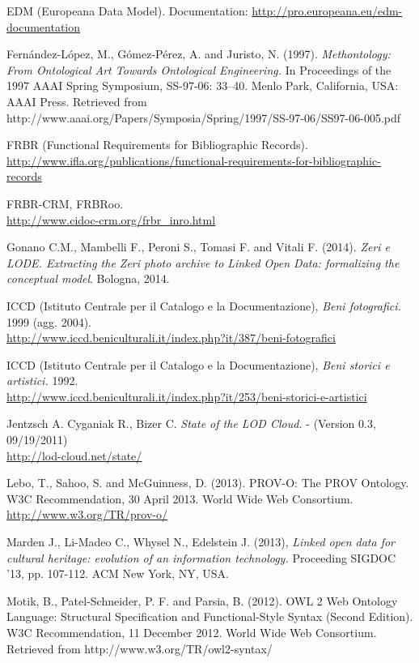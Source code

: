 \begin{thebibliography}{90}
 EDM (Europeana Data Model). Documentation: \url{http://pro.europeana.eu/edm-documentation}

 Fernández-López, M., Gómez-Pérez, A. and Juristo, N. (1997). \emph{Methontology: From Ontological Art Towards Ontological Engineering.} In Proceedings of the 1997 AAAI Spring Symposium, SS-97-06: 33–40. Menlo Park, California, USA: AAAI Press. Retrieved from http://www.aaai.org/Papers/Symposia/Spring/1997/SS-97-06/SS97-06-005.pdf

 FRBR (Functional Requirements for Bibliographic Records).\\
\url{http://www.ifla.org/publications/functional-requirements-for-bibliographic-records}

 FRBR-CRM, FRBRoo.\\
\url{http://www.cidoc-crm.org/frbr_inro.html}

 Gonano C.M., Mambelli F., Peroni S., Tomasi F. and Vitali F. (2014). \emph{Zeri e LODE. Extracting the Zeri photo archive to Linked Open Data: formalizing the conceptual model}. Bologna, 2014.

 ICCD (Istituto Centrale per il Catalogo e la Documentazione), \emph{Beni fotografici.} 1999 (agg. 2004).\\
\url{http://www.iccd.beniculturali.it/index.php?it/387/beni-fotografici}

 ICCD (Istituto Centrale per il Catalogo e la Documentazione), \emph{Beni storici e artistici.} 1992.\\
\url{http://www.iccd.beniculturali.it/index.php?it/253/beni-storici-e-artistici}

 Jentzsch A. Cyganiak R., Bizer C. \emph{State of the LOD Cloud.} - (Version 0.3, 09/19/2011)\\
\url{http://lod-cloud.net/state/}

 Lebo, T., Sahoo, S. and McGuinness, D. (2013). PROV-O: The PROV Ontology. W3C Recommendation, 30 April 2013. World Wide Web Consortium.\\
\url{http://www.w3.org/TR/prov-o/}

 Marden J., Li-Madeo C., Whysel N., Edelstein J. (2013), \emph{Linked open data for cultural heritage: evolution of an information technology.} Proceeding SIGDOC '13, pp. 107-112. ACM New York, NY, USA.

 Motik, B., Patel-Schneider, P. F. and Parsia, B. (2012). OWL 2 Web Ontology Language: Structural Specification and Functional-Style Syntax (Second Edition). W3C Recommendation, 11 December 2012. World Wide Web Consortium. Retrieved from http://www.w3.org/TR/owl2-syntax/


\end{thebibliography}

